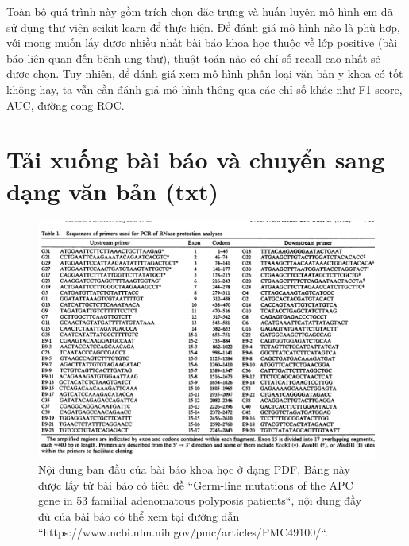 \documentclass[../DoAn.tex]{subfiles}
\begin{document}
Toàn bộ quá trình này gồm trích chọn đặc trưng và huấn luyện mô hình em đã sử dụng thư viện scikit learn để thực hiện. Để đánh giá mô hình nào là phù hợp, với mong muốn lấy được nhiều nhất bài báo khoa học thuộc về lớp positive (bài báo liên quan đến bệnh ung thư), thuật toán nào có chỉ số recall cao nhất sẽ được chọn. Tuy nhiên, để đánh giá xem mô hình phân loại văn bản y khoa có tốt không hay, ta vẫn cần đánh giá mô hình thông qua các chỉ số khác như F1 score, AUC, đường cong ROC.

\section{Tải xuống bài báo và chuyển sang dạng văn bản (txt)}
\begin{figure}
\centering
\includegraphics[width=1.0\linewidth]{Hinh_ve/PDFraw.png}
\caption{Nội dung ban đầu của bài báo khoa học ở dạng PDF, Bảng này được lấy từ bài báo có tiêu đề ``Germ-line mutations of the APC gene in 53 familial adenomatous polyposis patients``, nội dung đầy đủ của bài báo có thể xem tại đường dẫn ``https://www.ncbi.nlm.nih.gov/pmc/articles/PMC49100/``.}
\label{fig:PDFraw1316610}
\end{figure}
\end{document}
